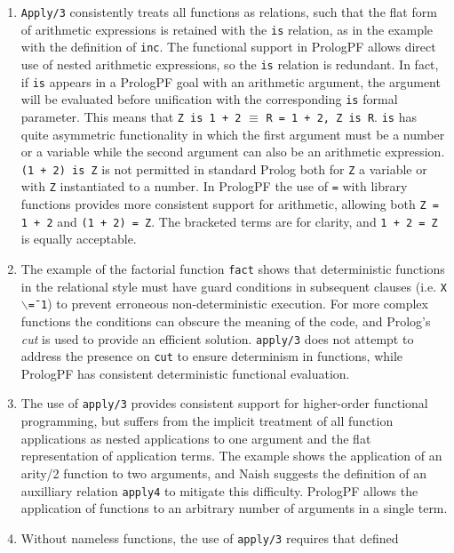 \begin{enumerate}
\item{\texttt{Apply/3} consistently treats all functions as relations, such
  that the flat form of arithmetic expressions is retained with the \texttt{is}
  relation, as in the example with the definition of \texttt{inc}.  The functional
  support in PrologPF allows direct use of nested arithmetic expressions, so the
  \texttt{is} relation is redundant.  In fact, if \texttt{is} appears in a
  PrologPF goal with an arithmetic argument, the argument will be evaluated before
  unification with the corresponding \texttt{is} formal parameter.  This means that
  \texttt{Z is 1 + 2} $\equiv$ \texttt{R = 1 + 2, Z is R}.  \texttt{is}
  has quite asymmetric functionality
  in which the first argument must be a number or a variable while
  the second argument can also be an arithmetic expression.
  \texttt{(1 + 2) is Z} is not permitted in standard Prolog both for
  \texttt{Z} a variable or with \texttt{Z} instantiated to a number.  In PrologPF the
  use of \texttt{=} with library functions provides more consistent support for
  arithmetic,  allowing both \texttt{Z = 1 + 2} and \texttt{(1 + 2) = Z}.  The
  bracketed terms are for clarity, and \texttt{1 + 2 = Z} is equally acceptable.}
\item{The example of the factorial function \texttt{fact} shows that deterministic
  functions in the relational style must have guard conditions in subsequent clauses
  (i.e. \texttt{X $\backslash$\== 1}) to prevent erroneous non-deterministic execution.
  For more complex functions the conditions can obscure the meaning of the code, and
  Prolog's \textit{cut} is used to provide an efficient solution.  \texttt{apply/3}
  does not attempt to address the presence on \texttt{cut} to ensure determinism
  in functions, while PrologPF has consistent deterministic functional evaluation.}
\item{The use of \texttt{apply/3} provides consistent support for higher-order
  functional programming, but suffers from the implicit treatment of all function
  applications as nested applications to one argument and the flat representation of
  application terms.  The example shows the application of an arity/2 function to
  two arguments, and Naish \cite{Nai96} suggests the definition of an auxilliary
  relation \texttt{apply4} to mitigate this difficulty.  PrologPF allows the
  application of functions to an arbitrary number of arguments in a single term.}
\item{Without nameless functions, the use of \texttt{apply/3} requires that defined
}
\end{enumerate}
